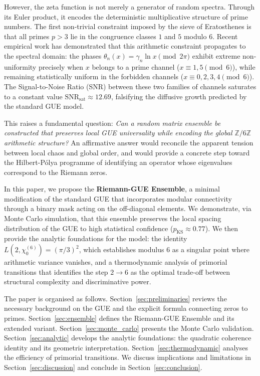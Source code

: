 \documentclass[12pt,a4paper]{article}
\theoremstyle{plain}
\theoremstyle{definition}
\theoremstyle{remark}
\begin{document}
However, the zeta function is not merely a generator of random spectra. Through its Euler product, it encodes the deterministic multiplicative structure of prime numbers. The first non-trivial constraint imposed by the sieve of Eratosthenes is that all primes $p>3$ lie in the congruence classes $1$ and $5$ modulo $6$. Recent empirical work \cite{R1} has demonstrated that this arithmetic constraint propagates to the spectral domain: the phases $\theta_n(x) = \gamma_n \ln x \pmod{2\pi}$ exhibit extreme non-uniformity precisely when $x$ belongs to a prime channel ($x \equiv 1,5 \pmod{6}$), while remaining statistically uniform in the forbidden channels ($x \equiv 0,2,3,4 \pmod{6}$). The Signal-to-Noise Ratio (SNR) between these two families of channels saturates to a constant value $\mathrm{SNR}_{\mathrm{sat}} \approx 12.69$, falsifying the diffusive growth predicted by the standard GUE model.

This raises a fundamental question: \emph{Can a random matrix ensemble be constructed that preserves local GUE universality while encoding the global $\mathbb{Z}/6\mathbb{Z}$ arithmetic structure?} An affirmative answer would reconcile the apparent tension between local chaos and global order, and would provide a concrete step toward the Hilbert-Pólya programme of identifying an operator whose eigenvalues correspond to the Riemann zeros.

In this paper, we propose the \textbf{Riemann-GUE Ensemble}, a minimal modification of the standard GUE that incorporates modular connectivity through a binary mask acting on the off-diagonal elements. We demonstrate, via Monte Carlo simulation, that this ensemble preserves the local spacing distribution of the GUE to high statistical confidence ($p_{\mathrm{KS}} \approx 0.77$). We then provide the analytic foundations for the model: the identity $L(2,\chi_0^{(6)}) = (\pi/3)^2$, which establishes modulus $6$ as a singular point where arithmetic variance vanishes, and a thermodynamic analysis of primorial transitions that identifies the step $2 \to 6$ as the optimal trade-off between structural complexity and discriminative power.

The paper is organised as follows. Section~\ref{sec:preliminaries} reviews the necessary background on the GUE and the explicit formula connecting zeros to primes. Section~\ref{sec:ensemble} defines the Riemann-GUE Ensemble and its extended variant. Section~\ref{sec:monte_carlo} presents the Monte Carlo validation. Section~\ref{sec:analytic} develops the analytic foundations: the quadratic coherence identity and its geometric interpretation. Section~\ref{sec:thermodynamic} analyses the efficiency of primorial transitions. We discuss implications and limitations in Section~\ref{sec:discussion} and conclude in Section~\ref{sec:conclusion}.
\end{document}
